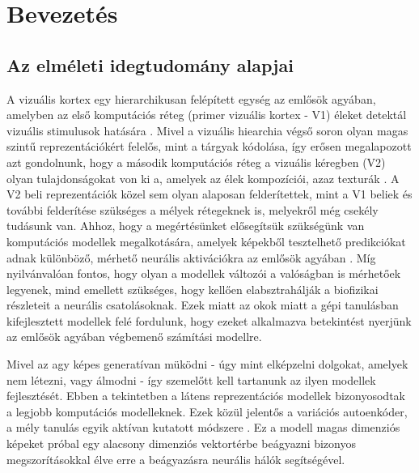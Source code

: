 \documentclass[12pt, english]{article}
\begin{document}
\tableofcontents
\newpage

\section{Bevezetés}

\vspace{7mm}

\subsection{Az elméleti idegtudomány alapjai}

\vspace{7mm}

\par A vizuális kortex egy hierarchikusan felépített egység az emlősök agyában, amelyben az első komputációs réteg (primer vizuális kortex - V1) éleket detektál vizuális stimulusok hatására \cite{hubel1968receptive}. Mivel a vizuális hiearchia végső soron olyan magas szintű reprezentációkért felelős, mint a tárgyak kódolása, így erősen megalapozott azt gondolnunk, hogy a második komputációs réteg a vizuális kéregben (V2) olyan tulajdonságokat von ki a, amelyek az élek kompozíciói, azaz texturák \cite{ZiembaV2}. A V2 beli reprezentációk közel sem olyan alaposan felderítettek, mint a V1 beliek és további felderítése szükséges a mélyek rétegeknek is, melyekről még csekély tudásunk van. Ahhoz, hogy a megértésünket elősegítsük szükségünk van komputációs modellek megalkotására, amelyek képekből tesztelhető predikciókat adnak különböző, mérhető neurális aktivációkra az emlősök agyában \cite{yamins2014performance}. Míg nyilvánvalóan fontos, hogy olyan a modellek változói a valóságban is mérhetőek legyenek, mind emellett szükséges, hogy kellően elabsztrahálják a biofizikai részleteit a neurális csatolásoknak. Ezek miatt az okok miatt a gépi tanulásban kifejlesztett modellek felé fordulunk, hogy ezeket alkalmazva betekintést nyerjünk az emlősök agyában végbemenő számítási modellre. 

\vspace{4mm}

\par Mivel az agy képes generatívan müködni - úgy mint elképzelni dolgokat, amelyek nem létezni, vagy álmodni - így szemelőtt kell tartanunk az ilyen modellek fejlesztését. Ebben a tekintetben a látens reprezentációs modellek bizonyosodtak a legjobb komputációs modelleknek. Ezek közül jelentős a variációs autoenkóder, a mély tanulás egyik aktívan kutatott módszere \cite{kingma2013auto}. Ez a modell magas dimenziós képeket próbal egy alacsony dimenziós vektortérbe beágyazni bizonyos megszorításokkal élve erre a beágyazásra neurális hálók segítségével.
\end{document}
